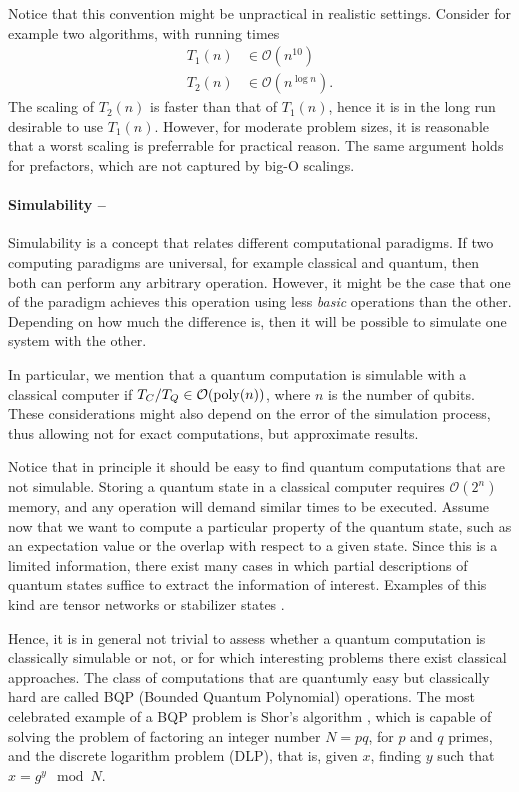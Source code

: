 \documentclass[]{report}
\begin{document}
Notice that this convention might be unpractical in realistic settings. Consider for example two algorithms, with running times
\begin{align}
T_1(n) & \in \mathcal O(n^{10}) \\
T_2(n) & \in \mathcal O(n^{\log n}).
\end{align}
The scaling of $T_2(n)$ is faster than that of $T_1(n)$, hence it is in the long run desirable to use $T_1(n)$. However, for moderate problem sizes, it is reasonable that a worst scaling is preferrable for practical reason. The same argument holds for prefactors, which are not captured by big-O scalings. 

\paragraph{Simulability --} Simulability is a concept that relates different computational paradigms. If two computing paradigms are universal, for example classical and quantum, then both can perform any arbitrary operation. However, it might be the case that one of the paradigm achieves this operation using less \textit{basic} operations than the other. Depending on how much the difference is, then it will be possible to simulate one system with the other. 

In particular, we mention that a quantum computation is simulable with a classical computer if $T_C / T_Q \in \mathcal O({\rm poly} (n))$, where $n$ is the number of qubits. These considerations might also depend on the error of the simulation process, thus allowing not for exact computations, but approximate results. 

Notice that in principle it should be easy to find quantum computations that are not simulable. Storing a quantum state in a classical computer requires $\mathcal O(2^n)$ memory, and any operation will demand similar times to be executed. Assume now that we want to compute a particular property of the quantum state, such as an expectation value or the overlap with respect to a given state. Since this is a limited information, there exist many cases in which partial descriptions of quantum states suffice to extract the information of interest. Examples of this kind are tensor networks \cite{orus2014practical} or stabilizer states \cite{gottesman1998heisenberg}. 

Hence, it is in general not trivial to assess whether a quantum computation is classically simulable or not, or for which interesting problems there exist classical approaches. The class of computations that are quantumly easy but classically hard are called BQP (Bounded Quantum Polynomial) operations. The most celebrated example of a BQP problem is Shor's algorithm \cite{shor1997polynomialtime}, which is capable of solving the problem of factoring an integer number $N = pq$, for $p$ and $q$ primes, and the discrete logarithm problem (DLP), that is, given $x$, finding $y$ such that $x = g^y \mod N$.
\end{document}
